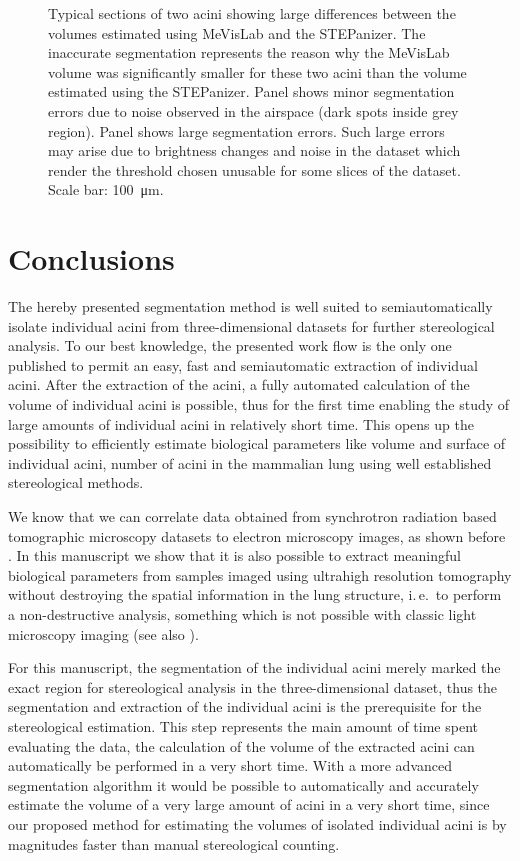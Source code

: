 \documentclass[a4paper,DIV=calc,abstract,english]{scrartcl}
\newcommand{\ie}{i.\,e.\ }
\begin{document}
\begin{figure}[htb]
{		\label{subfig:60e_acinus38}%
	}%
	\hfill%
	\caption{Typical sections of two acini showing large differences between the volumes estimated using MeVisLab and the STEPanizer.
		The inaccurate segmentation represents the reason why the MeVisLab volume was significantly smaller for these two acini than the volume estimated using the STEPanizer.
		Panel \protect{} shows minor segmentation errors due to noise observed in the airspace (dark spots inside grey region).
		Panel \protect{} shows large segmentation errors.
		Such large errors may arise due to brightness changes and noise in the dataset which render the threshold chosen unusable for some slices of the dataset.
		Scale bar: \SI{100}{\micro\meter}.}
	\label{fig:MeVisSegmentation}
\end{figure}

\section{Conclusions}
The hereby presented segmentation method is well suited to semiautomatically isolate individual acini from three-dimensional datasets for further stereological analysis.
To our best knowledge, the presented work flow is the only one published to permit an easy, fast and semiautomatic extraction of individual acini.
After the extraction of the acini, a fully automated calculation of the volume of individual acini is possible, thus for the first time enabling the study of large amounts of individual acini in relatively short time.
This opens up the possibility to efficiently estimate biological parameters like volume and surface of individual acini, number of acini in the mammalian lung using well established stereological methods.

We know that we can correlate data obtained from synchrotron radiation based tomographic microscopy datasets to electron microscopy images, as shown before \cite{Haberthur2009}.
In this manuscript we show that it is also possible to extract meaningful biological parameters from samples imaged using ultrahigh resolution tomography without destroying the spatial information in the lung structure, \ie to perform a non-destructive analysis, something which is not possible with classic light microscopy imaging (see also \cite{Vasilescu2012}).

For this manuscript, the segmentation of the individual acini merely marked the exact region for stereological analysis in the three-dimensional dataset, thus the segmentation and extraction of the individual acini is the prerequisite for the stereological estimation.
This step represents the main amount of time spent evaluating the data, the calculation of the volume of the extracted acini can automatically be performed in a very short time.
With a more advanced segmentation algorithm it would be possible to automatically and accurately estimate the volume of a very large amount of acini in a very short time, since our proposed method for estimating the volumes of isolated individual acini is by magnitudes faster than manual stereological counting.
\end{document}
